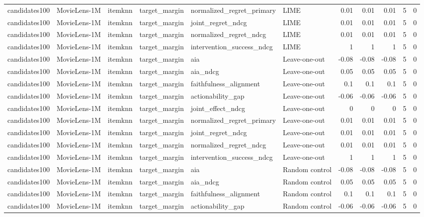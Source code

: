 \begin{table}[t]
{\begin{tabular}{llllllrrrrr}
candidates100 & MovieLens-1M & itemknn & target\_margin & normalized\_regret\_primary & LIME & 0.01 & 0.01 & 0.01 & 5 & 0 \\
candidates100 & MovieLens-1M & itemknn & target\_margin & joint\_regret\_ndcg & LIME & 0.01 & 0.01 & 0.01 & 5 & 0 \\
candidates100 & MovieLens-1M & itemknn & target\_margin & normalized\_regret\_ndcg & LIME & 0.01 & 0.01 & 0.01 & 5 & 0 \\
candidates100 & MovieLens-1M & itemknn & target\_margin & intervention\_success\_ndcg & LIME & 1 & 1 & 1 & 5 & 0 \\
candidates100 & MovieLens-1M & itemknn & target\_margin & aia & Leave-one-out & -0.08 & -0.08 & -0.08 & 5 & 0 \\
candidates100 & MovieLens-1M & itemknn & target\_margin & aia\_ndcg & Leave-one-out & 0.05 & 0.05 & 0.05 & 5 & 0 \\
candidates100 & MovieLens-1M & itemknn & target\_margin & faithfulness\_alignment & Leave-one-out & 0.1 & 0.1 & 0.1 & 5 & 0 \\
candidates100 & MovieLens-1M & itemknn & target\_margin & actionability\_gap & Leave-one-out & -0.06 & -0.06 & -0.06 & 5 & 0 \\
candidates100 & MovieLens-1M & itemknn & target\_margin & joint\_effect\_ndcg & Leave-one-out & 0 & 0 & 0 & 5 & 0 \\
candidates100 & MovieLens-1M & itemknn & target\_margin & normalized\_regret\_primary & Leave-one-out & 0.01 & 0.01 & 0.01 & 5 & 0 \\
candidates100 & MovieLens-1M & itemknn & target\_margin & joint\_regret\_ndcg & Leave-one-out & 0.01 & 0.01 & 0.01 & 5 & 0 \\
candidates100 & MovieLens-1M & itemknn & target\_margin & normalized\_regret\_ndcg & Leave-one-out & 0.01 & 0.01 & 0.01 & 5 & 0 \\
candidates100 & MovieLens-1M & itemknn & target\_margin & intervention\_success\_ndcg & Leave-one-out & 1 & 1 & 1 & 5 & 0 \\
candidates100 & MovieLens-1M & itemknn & target\_margin & aia & Random control & -0.08 & -0.08 & -0.08 & 5 & 0 \\
candidates100 & MovieLens-1M & itemknn & target\_margin & aia\_ndcg & Random control & 0.05 & 0.05 & 0.05 & 5 & 0 \\
candidates100 & MovieLens-1M & itemknn & target\_margin & faithfulness\_alignment & Random control & 0.1 & 0.1 & 0.1 & 5 & 0 \\
candidates100 & MovieLens-1M & itemknn & target\_margin & actionability\_gap & Random control & -0.06 & -0.06 & -0.06 & 5 & 0 \\

\end{tabular}}
\end{table}
